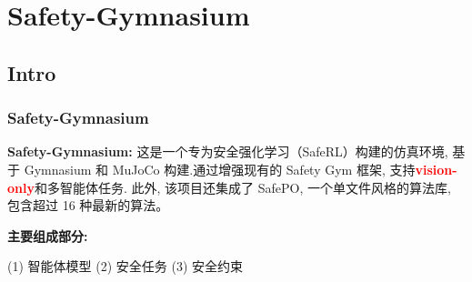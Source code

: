 \documentclass[10pt,mathserif]{beamer}%
\begin{document}
\section{Safety-Gymnasium}

\subsection{Intro}

\begin{frame}[t, fragile]
\frametitle{Safety-Gymnasium}

\begin{minipage}[t]{\textwidth}
   \textbf{Safety-Gymnasium:} 这是一个专为安全强化学习（SafeRL）构建的仿真环境, 基于 Gymnasium 和 MuJoCo 构建.通过增强现有的 Safety Gym 框架, 支持\textbf{\textcolor{red}{vision-only}}和多智能体任务. 此外, 该项目还集成了 SafePO, 一个单文件风格的算法库, 包含超过 16 种最新的算法。
   
   \vspace{0.3cm}
   
   \textbf{主要组成部分:}

   
   \vspace{0.2cm}
   \hspace*{0.2cm} 
   (1) 智能体模型 \hspace*{1cm} 
   (2) 安全任务 \hspace*{1cm} 
   (3) 安全约束
   \hfill
\end{minipage}


\vfill
\begin{minipage}[bp]{\textwidth}


\end{minipage}
\end{frame}
\end{document}
